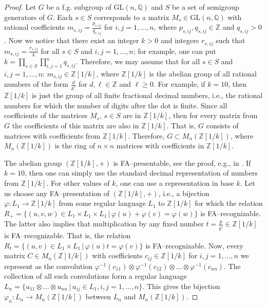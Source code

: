 \documentclass[article,12pt]{elsarticle}
\begin{document}
\begin{proof} 
	Let $G$ be a f.g. subgroup of 
	$\mathrm{GL}(n,\mathbb{Q})$ and $S$ be a 
	set of semigroup generators of $G$. 
	Each $s \in S$ corresponds to a 
	matrix $M_s \in \mathrm{GL}(n,\mathbb{Q})$ 
	with rational coefficients 
	$m_{s,ij} = \frac{p_{s,ij}}{q_{s,ij}}$
	for $i,j =1,\dots,n$, 
	where $p_{s,ij}, q_{s,ij} \in \mathbb{Z}$ and
	$q_{s,ij}>0$.   
	Now we notice that there exist an integer $k>0$
	and integers $r_{s,ij}$ such that 
	$m_{s,ij} = \frac{r_{s,ij}}{k}$ for all 
	$s \in  S$ and $i,j =1,\dots, n$; 
	for example, one can put 
	$k = \prod\limits_{s \in S} 
	\prod \limits_{i,j =1}^{n} q_{s,ij}$. 
	Therefore, we may assume  
	that for all $s \in S$ and 
	$i,j =1,\dots,n$: 
	$m_{s,ij} \in \mathbb{Z}[1/k]$, where 
	$\mathbb{Z}\left[1/k\right]$ is the abelian group of 
	all rational numbers of the form 
	$\frac{d}{k^\ell}$ for $d, \ell \in \mathbb{Z}$ and 
	$\ell \geqslant 0$. 
	For example, if $k =10$, then 
	$\mathbb{Z}\left[1/k\right]$ is just 
	the group of all finite fractional 
	decimal numbers, i.e., the rational 
	numbers for which the number of digits 
	after the dot is finite.   
	Since all coefficients of the matrices 
	$M_s$, $s \in S$ are in 
	$\mathbb{Z}\left[1/k\right]$, 
	then for every matrix from $G$ 
	the coefficients of this matrix are 
	also in $\mathbb{Z}[1/k]$. That is, 
	$G$ consists of matrices with coefficients 
	from $\mathbb{Z}\left[1/k\right]$. Therefore, 
	$G \subset M_n (\mathbb{Z}\left[1/k\right])$, 
	where $M_n (\mathbb{Z}\left[1/k\right])$ is the
	ring of $n \times n$ matrices with coefficients in 
	$\mathbb{Z}\left[1/k\right]$.   
	
	
	The abelian group 
	$\left(\mathbb{Z}\left[1/k\right],+\right)$ 
	is FA--presentable, 
	see the proof, e.g., in 
	\cite{NiesSemukhin07}. 
	If $k=10$,  
	then one can simply use the standard 
	decimal representation of numbers from   
	$\mathbb{Z}\left[1/k\right]$.
	For other values of $k$, one can use a 
	representation in base $k$.   
	Let us choose any FA--presentation of 
	$\left( \mathbb{Z} \left[ 1/k \right], +\right)$, i.e., 
	a bijection 
	$\varphi : L_1 \rightarrow \mathbb{Z}\left[1/k\right]$ 
	from some regular language $L_1$ to         
	$\mathbb{Z}\left[1/k\right]$ for which 
	the relation $R_{+} = \{ \left(u,v,w \right) 
	\in L_1 \times L_1 \times L_1 \,|\,\varphi(u) + 
	\varphi(v) = \varphi(w) \}$ is FA--recognizable.
	The latter also implies that multiplication 
	by any fixed number $t = \frac{p}{k^i} \in 
	\mathbb{Z}\left[1/k \right]$ is FA--recognizable.
	That is,  
	the relation 
	$R_t = \{\left(u, v\right)  \in L_1 \times L_1 \, | \, 
	\varphi (u) t  =\varphi(v)\}$
	is FA--recognizable.  
	Now, every matrix
	$C \in M_n(\mathbb{Z}\left[1/k\right])$ 
	with coefficients 
	$c_{ij} \in  \mathbb{Z}\left[1/k\right]$ 
	for $i,j=1,\dots,n$ we represent as 
	the convolution 
	$\varphi^{-1}(c_{11}) \otimes \varphi^{-1}(c_{12})
	\otimes  \dots \otimes \varphi^{-1}(c_{nn})$. 
	The collection of all such convolutions 
	form a regular language
	$L_n 
	= \{u_{11} \otimes \dots \otimes u_{nn}\, |\, 
	u_{ij} \in L_1, i,j=1,\dots,n\}$. 
	This  gives the  bijection 
	$\varphi_n : L_n \rightarrow M_n (\mathbb{Z}\left[1/k\right])$
	between $L_n$ and 
	$M_n (\mathbb{Z}\left[1/k\right])$. 
	

\end{proof}
\end{document}
